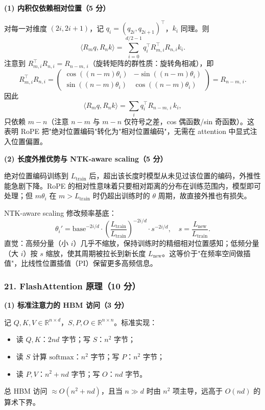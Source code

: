 \documentclass[11pt,a4paper]{article}
\begin{document}
\noindent\textbf{(1) 内积仅依赖相对位置（5 分）}

对每一对维度 $(2i, 2i+1)$，记 $q_i=(q_{2i}, q_{2i+1})^{\top}$，$k_i$ 同理。则
\[
\langle R_m q, R_n k\rangle = \sum_{i=0}^{d/2-1} q_i^{\top} R_{m,i}^{\top} R_{n,i} k_i.
\]
注意到 $R_{m,i}^{\top} R_{n,i} = R_{n-m,\,i}$（旋转矩阵的群性质：旋转角相减），即
\[
R_{m,i}^{\top} R_{n,i} = \begin{pmatrix} \cos((n-m)\theta_i) & -\sin((n-m)\theta_i) \\ \sin((n-m)\theta_i) & \cos((n-m)\theta_i) \end{pmatrix} = R_{n-m,\,i}.
\]
因此
\[
\langle R_m q, R_n k\rangle = \sum_i q_i^{\top} R_{n-m,\,i}\, k_i,
\]
只依赖 $m-n$（注意 $n-m$ 与 $m-n$ 仅符号之差，cos 偶函数/sin 奇函数）。这表明 RoPE 把"绝对位置编码"转化为"相对位置编码"，无需在 attention 中显式注入位置偏置。

\noindent\textbf{(2) 长度外推优势与 NTK-aware scaling（5 分）}

绝对位置编码训练到 $L_{\text{train}}$ 后，超出该长度时模型从未见过该位置的编码，外推性能急剧下降。RoPE 的相对性意味着只要相对距离的分布在训练范围内，模型即可处理；但 $m\theta_i$ 在 $m>L_{\text{train}}$ 时仍超出训练时的 $\theta$ 周期，故直接外推也有损失。

NTK-aware scaling 修改频率基底：
\[
\theta_i' = \mathrm{base}^{-2i/d} \cdot \left(\frac{L_{\text{train}}}{L_{\text{train}}}\right)^{-2i/d}\cdot s^{-2i/d},\quad s=\frac{L_{\text{new}}}{L_{\text{train}}}.
\]
直觉：高频分量（小 $i$）几乎不缩放，保持训练时的精细相对位置感知；低频分量（大 $i$）按 $s$ 缩放，使其周期被拉长到新长度 $L_{\text{new}}$。这等价于"在频率空间做插值"，比线性位置插值（PI）保留更多高频信息。

\subsubsection*{21. FlashAttention 原理（10 分）}

\noindent\textbf{(1) 标准注意力的 HBM 访问（3 分）}

记 $Q,K,V\in\mathbb{R}^{n\times d}$，$S,P,O\in\mathbb{R}^{n\times n}$。标准实现：
\begin{itemize}[leftmargin=2em,itemsep=0pt,parsep=0pt,topsep=0pt]
  \item 读 $Q,K$：$2nd$ 字节；写 $S$：$n^2$ 字节；
  \item 读 $S$ 计算 $\mathrm{softmax}$：$n^2$ 字节；写 $P$：$n^2$ 字节；
  \item 读 $P,V$：$n^2+nd$ 字节；写 $O$：$nd$ 字节。
\end{itemize}
总 HBM 访问 $\approx O(n^2 + nd)$，且当 $n\gg d$ 时由 $n^2$ 项主导，远高于 $O(nd)$ 的算术下界。
\end{document}

